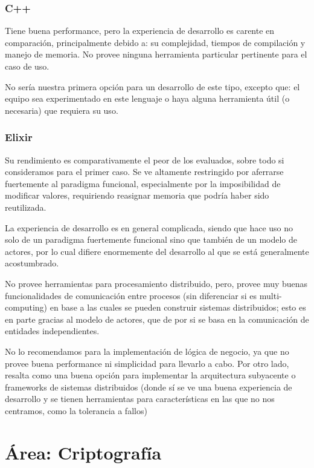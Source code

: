 \documentclass[11pt]{article}
\let\Oldsection\section
\renewcommand{\section}{\FloatBarrier\Oldsection}
\let\Oldsubsubsection\subsubsection
\renewcommand{\subsubsection}{\FloatBarrier\Oldsubsubsection}
\begin{document}
\subsubsection{C++}

Tiene buena performance, pero la experiencia de desarrollo es carente en comparación, principalmente debido a: su complejidad, tiempos de compilación y manejo de memoria.
No provee ninguna herramienta particular pertinente para el caso de uso.

No sería nuestra primera opción para un desarrollo de este tipo, excepto que: el equipo sea experimentado en este lenguaje o haya alguna herramienta útil (o necesaria) que requiera su uso.

\subsubsection{Elixir}

Su rendimiento es comparativamente el peor de los evaluados, sobre todo si consideramos para el primer caso. Se ve altamente restringido por aferrarse fuertemente al paradigma funcional, especialmente por la imposibilidad de modificar valores, requiriendo reasignar memoria que podría haber sido reutilizada.

La experiencia de desarrollo es en general complicada, siendo que hace uso no solo de un paradigma fuertemente funcional sino que también de un modelo de actores, por lo cual difiere enormemente del desarrollo al que se está generalmente acostumbrado.

No provee herramientas para procesamiento distribuido, pero, provee muy buenas funcionalidades de comunicación entre procesos (sin diferenciar si es multi-computing) en base a las cuales se pueden construir sistemas distribuidos; esto es en parte gracias al modelo de actores, que de por si se basa en la comunicación de entidades independientes.

No lo recomendamos para la implementación de lógica de negocio, ya que no provee buena performance ni simplicidad para llevarlo a cabo. Por otro lado, resalta como una buena opción para implementar la arquitectura subyacente o frameworks de sistemas distribuidos (donde sí se ve una buena experiencia de desarrollo y se tienen herramientas para características en las que no nos centramos, como la tolerancia a fallos)

\newpage

\section{Área: Criptografía}
\end{document}
